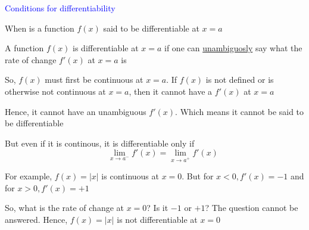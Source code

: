 \documentclass[14pt,fleqn]{extarticle}
\begin{document}
 
\begin{skill}
\textcolor{blue}{Conditions for differentiability}

When is a function $f(x)$ said to be differentiable at $x=a$
\end{skill}

\newcard 

A function $f(x)$ is differentiable at $x=a$ if one can \underline{unambiguosly} say
what the rate of change $f'(x)$ at $x=a$ is \newline 

So, $f(x)$ must first be continuous at $x=a$. If $f(x)$ is not defined or is otherwise not continuous at $x=a$, then it cannot have a $f'(x)$ at $x=a$ \newline \newline 

Hence, it cannot have an unambiguous $f'(x)$. Which means it cannot be said to be differentiable \newline 

But even if it is continous, it is differentiable only if 
\[ \qquad \lim_{x\to a^-} f'(x) = \lim_{x\to a^+} f'(x) \]

For example, $f(x) = \vert x\vert$ is continuous at $x=0$. But for $x < 0, f'(x) = -1$ and for $x > 0, f'(x) = +1$ \newline 

So, what is the rate of change at $x=0$? Is it $-1$ or $+1$? The question cannot be answered. Hence, $f(x)=\vert x\vert$ is not differentiable at $x=0$ 
\end{document}
